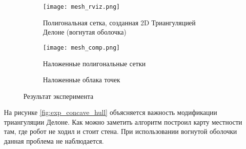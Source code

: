 \begin{figure}[H]
    \begin{center}
    \begin{subfigure}[t]{0.4\textwidth}
        \centering\texttt{[image: mesh\_rviz.png]}
        \caption{Полигональная сетка, созданная 2D Триангуляцией Делоне (вогнутая оболочка)}
    \end{subfigure}
    \begin{subfigure}[t]{0.59\textwidth}
        \centering\texttt{[image: mesh\_comp.png]}
        \caption{Наложенные полигональные сетки}
    \end{subfigure}

    \begin{subfigure}[t]{0.9\textwidth}
            \centering
            \caption{Наложенные облака точек}
            \label{fig:sampled_pcd.png}
    \end{subfigure}
    \caption{Результат эксперимента}
    \label{fig:result_meshes_blah}
\end{center}
\end{figure}

На рисунке \ref{fig:exp_concave_hull} объясняется важность модификации триангуляции Делоне. Как можно заметить  алгоритм построил карту местности там, где робот не ходил и стоит стена. При использовании вогнутой оболочки  данная проблема не наблюдается.

